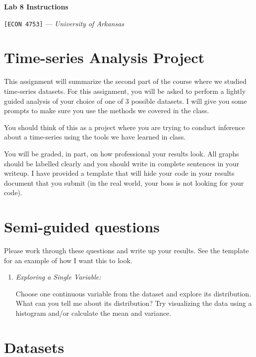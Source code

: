 \documentclass[12pt]{article}
\begin{document}
\begin{center}
  {\Huge\bf Lab 8 Instructions}
  
  \smallskip
  {\large\texttt{[ECON 4753]} — \textit{University of Arkansas}}

\end{center}

\section*{Time-series Analysis Project}

This assignment will summarize the second part of the course where we
studied time-series datasets. For this assignment, you will be asked to
perform a lightly guided analysis of your choice of one of 3 possible
datasets. I will give you some prompts to make sure you use the methods
we covered in the class.

You should think of this as a project where you are trying to conduct
inference about a time-series using the tools we have learned in class.

You will be graded, in part, on how professional your results look. All
graphs should be labelled clearly and you should write in complete
sentences in your writeup. I have provided a template that will hide
your code in your results document that you submit (in the real world,
your boss is not looking for your code).

\newpage
\section*{Semi-guided questions}

Please work through these questions and write up your results. See the
template for an example of how I want this to look.

\begin{enumerate}
  \item \emph{Exploring a Single Variable:} 
  
  Choose one continuous variable from the dataset and explore its distribution. What can you tell me about its distribution? Try visualizing the data using a histogram and/or calculate the mean and variance.
\end{enumerate}

\newpage
\section*{Datasets}
\end{document}
